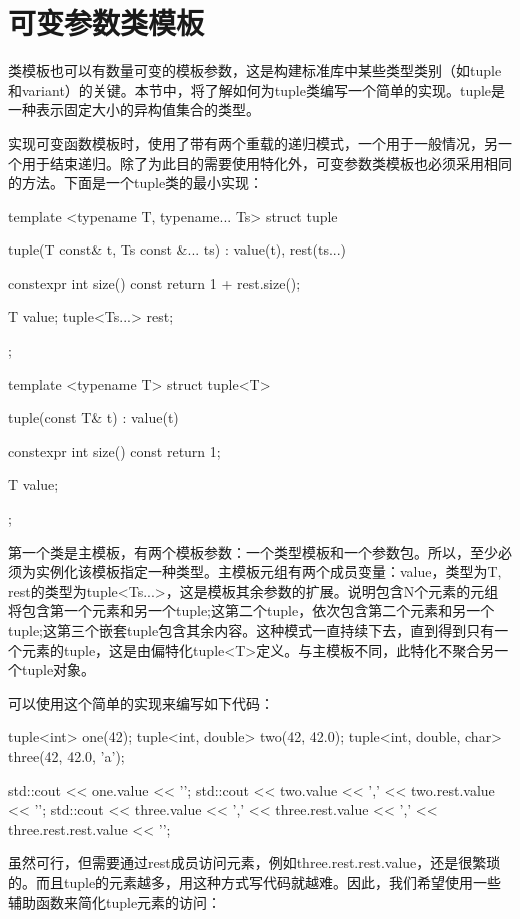 \section{可变参数类模板}
类模板也可以有数量可变的模板参数，这是构建标准库中某些类型类别（如tuple和variant）的关键。本节中，将了解如何为tuple类编写一个简单的实现。tuple是一种表示固定大小的异构值集合的类型。

实现可变函数模板时，使用了带有两个重载的递归模式，一个用于一般情况，另一个用于结束递归。除了为此目的需要使用特化外，可变参数类模板也必须采用相同的方法。下面是一个tuple类的最小实现：

\begin{cppcode}
template <typename T, typename... Ts>
struct tuple
{
	tuple(T const& t, Ts const &... ts)
	: value(t), rest(ts...)
	{
	}

	constexpr int size() const { return 1 + rest.size(); }
	
	T value;
	tuple<Ts...> rest;
};

template <typename T>
struct tuple<T>
{
	tuple(const T& t)
	: value(t)
	{
	}

	constexpr int size() const { return 1; }
	
	T value;
};
\end{cppcode}

第一个类是主模板，有两个模板参数：一个类型模板和一个参数包。所以，至少必须为实例化该模板指定一种类型。主模板元组有两个成员变量：value，类型为T, rest的类型为tuple<Ts...>，这是模板其余参数的扩展。说明包含N个元素的元组将包含第一个元素和另一个tuple;这第二个tuple，依次包含第二个元素和另一个tuple;这第三个嵌套tuple包含其余内容。这种模式一直持续下去，直到得到只有一个元素的tuple，这是由偏特化tuple<T>定义。与主模板不同，此特化不聚合另一个tuple对象。

可以使用这个简单的实现来编写如下代码：

\begin{cppcode}
tuple<int> one(42);
tuple<int, double> two(42, 42.0);
tuple<int, double, char> three(42, 42.0, 'a');

std::cout << one.value << '\n';
std::cout << two.value << ','
          << two.rest.value << '\n';
std::cout << three.value << ','
          << three.rest.value << ','
          << three.rest.rest.value << '\n';
\end{cppcode}

虽然可行，但需要通过rest成员访问元素，例如three.rest.rest.value，还是很繁琐的。而且tuple的元素越多，用这种方式写代码就越难。因此，我们希望使用一些辅助函数来简化tuple元素的访问：

